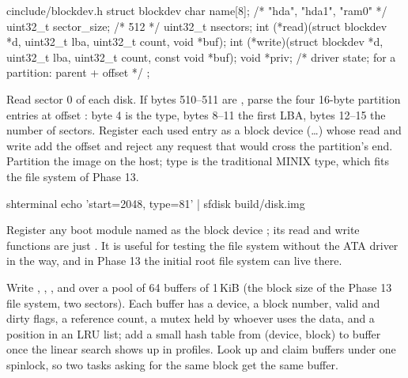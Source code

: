 \documentclass[11pt,a4paper]{article}
\begin{document}
\begin{lst}{c}{include/blockdev.h}
struct blockdev {
    char     name[8];                   /* "hda", "hda1", "ram0" */
    uint32_t sector_size;               /* 512                   */
    uint32_t nsectors;
    int    (*read)(struct blockdev *d, uint32_t lba, uint32_t count, void *buf);
    int    (*write)(struct blockdev *d, uint32_t lba, uint32_t count, const void *buf);
    void    *priv;                      /* driver state; for a partition: parent + offset */
};
\end{lst}

Read sector 0 of each disk. If bytes 510--511 are , parse the four 16-byte partition entries at offset
: byte 4 is the type, bytes 8--11 the first LBA, bytes 12--15 the number of sectors. Register each used
entry as a block device (\dots{}) whose read and write add the offset and reject any request that
would cross the partition's end. Partition the image on the host; type  is the traditional MINIX type, which
fits the file system of Phase 13.

\begin{lst}{sh}{terminal}
echo 'start=2048, type=81' | sfdisk build/disk.img
\end{lst}

Register any boot module named  as the block device ; its read and write functions are just
. It is useful for testing the file system without the ATA driver in the way, and in Phase 13 the initial
root file system can live there.

Write , , ,  and  over a pool of 64 buffers of
1\,KiB (the block size of the Phase 13 file system, two sectors). Each buffer has a device, a block number, valid and
dirty flags, a reference count, a mutex held by whoever uses the data, and a position in an LRU list; add a small hash
table from (device, block) to buffer once the linear search shows up in profiles. Look up and claim buffers under one
spinlock, so two tasks asking for the same block get the same buffer.
\end{document}
